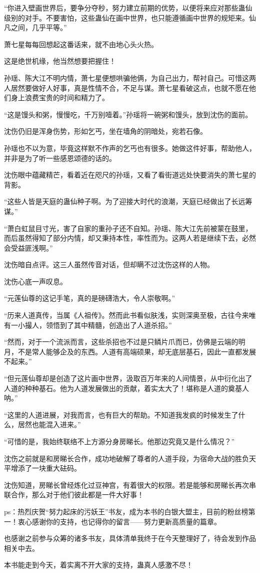 \begin{this_body}
“你进入壁画世界后，要争分夺秒，努力建立前期的优势，以便将来应对那些蛊仙级别的对手。不要害怕，这些蛊仙在画中世界，也只能遵循画中世界的规矩来。仙凡之间，几乎平等。”

萧七星每每回想起这番话来，就不由地心头火热。

这是绝世机缘，他当然想要把握住！

孙瑶、陈大江不明内情，萧七星便想哄骗他俩，为自己出力，帮衬自己。可惜这两人居然要做好人好事，真是性情不合，不足与谋。萧七星看破这点，也就不愿在他们身上浪费宝贵的时间和精力了。

“这是馒头和粥，慢慢吃，千万别噎着。”孙瑶将一碗粥和馒头，放到沈伤的面前。

沈伤仍旧是浑身伤势，形如乞丐，坐在墙角的阴暗处，宛若石像。

孙瑶也不以为意，毕竟这样默不作声的乞丐也有很多。她做这件好事，帮助他人，并非是为了听一些感恩颂德的话的。

沈伤眼中蕴藏精芒，看着近在咫尺的孙瑶，又看了看街道远处快要消失的萧七星的背影。

“这些人皆是天庭的蛊仙种子啊。为了迎接大时代的浪潮，天庭已经做出了长远筹谋。”

“萧白虹鼠目寸光，害了自家的重孙子还不自知。孙瑶、陈大江先前被蒙在鼓里，而后虽然得知了部分内情，却又秉持本性，率性而为。这两人若是继续下去，必然会受益匪浅啊。”

沈伤暗自点评。这三人虽然传音对话，但却瞒不过沈伤这样的人物。

沈伤心底一声叹息。

“元莲仙尊的这记手笔，真的是磅礴浩大，令人崇敬啊。”

“历来人道真传，当属《人祖传》。然而此书看似肤浅，实则深奥至极，古往今来唯有一小撮人，领悟到了其中精髓，创造出了人道杀招。”

“然而，对于一个流派而言，这些杀招也不过是只鳞片爪而已，仿佛是云端的明月，不是常人能够企及的东西。人道有高端硕果，却无底层基石，因此一直都发展不起来。”

“但元莲仙尊却是创造了这片画中世界，汲取百万年来的人间情景，从中衍化出了人道的种种基石。他为人道发展做出的贡献，着实太大了！堪称是人道的奠基人呐。”

“这里的人道进展，对我而言，也有巨大的帮助。不知道我发疯的时候发生了什么，居然也能混入进来。”

“可惜的是，我始终联络不上方源分身房睇长。他那边究竟又是什么情况？”

沈伤之前就是和房睇长合作，成功地破解了尊者的人道手段，为宿命大战的胜负天平增添了一块重大砝码。

沈伤知道，房睇长曾经炼化过豆神宫，有着很大的权限。若是能够和房睇长再次串联合作，那么对于他们彼此都是一件大好事！

ps：热烈庆贺“努力起床的污妖王”书友，成为本书的白银大盟主，目前的粉丝榜第一！衷心感谢你的支持，也记得你的留言——努力更新高质量的篇章。

也感谢之前参与众筹的诸多书友，具体清单我终于在今天整理好了，待会发到作品相关中去。

本书能走到今天，着实离不开大家的支持，蛊真人感激不尽！

\end{this_body}


